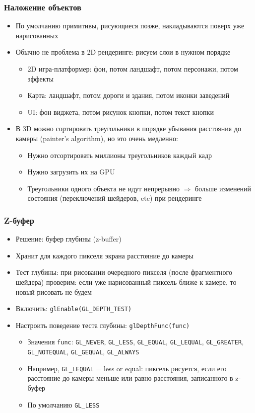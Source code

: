 \documentclass{beamer}
\begin{document}
\begin{frame}[fragile]
\frametitle{Наложение объектов}
\begin{itemize}
\item По умолчанию примитивы, рисующиеся позже, накладываются поверх уже нарисованных
\pause
\item Обычно не проблема в 2D рендеринге: рисуем слои в нужном порядке
\pause
\begin{itemize}
\item 2D игра-платформер: фон, потом ландшафт, потом персонажи, потом эффекты
\pause
\item Карта: ландшафт, потом дороги и здания, потом иконки заведений
\pause
\item UI: фон виджета, потом рисунок кнопки, потом текст кнопки
\end{itemize}
\pause
\item В 3D можно сортировать треугольники в порядке убывания расстояния до камеры (painter's algorithm), но это очень медленно:
\pause
\begin{itemize}
\item Нужно отсортировать миллионы треугольников каждый кадр
\pause
\item Нужно загрузить их на GPU
\pause
\item Треугольники одного объекта не идут непрерывно \begin{math}\Rightarrow\end{math} больше изменений состояния (переключений шейдеров, etc) при рендеринге
\end{itemize}
\end{itemize}
\end{frame}

\begin{frame}[fragile]
\frametitle{Z-буфер}
\begin{itemize}
\item Решение: буфер глубины (z-buffer)
\pause
\item Хранит для каждого пикселя экрана расстояние до камеры
\pause
\item Тест глубины: при рисовании очередного пикселя (после фрагментного шейдера) проверим: если уже нарисованный пиксель ближе к камере, то новый рисовать не будем
\pause
\item Включить: \verb|glEnable(GL_DEPTH_TEST)|
\pause
\item Настроить поведение теста глубины: \verb|glDepthFunc(func)|
\begin{itemize}
\item Значения \verb|func|: \verb|GL_NEVER|, \verb|GL_LESS|, \verb|GL_EQUAL|, \verb|GL_LEQUAL|, \verb|GL_GREATER|, \verb|GL_NOTEQUAL|, \verb|GL_GEQUAL|, \verb|GL_ALWAYS|
\pause
\item Например, \verb|GL_LEQUAL| = less or equal: пиксель рисуется, если его расстояние до камеры меньше или равно расстояния, записанного в z-буфер
\pause
\item По умолчанию \verb|GL_LESS|
\end{itemize}
\end{itemize}
\end{frame}
\end{document}
